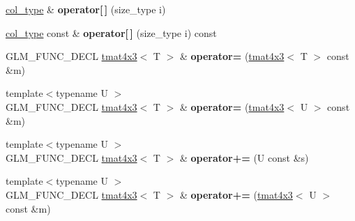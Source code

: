 \begin{DoxyCompactItemize}
\item 
\hypertarget{structglm_1_1detail_1_1tmat4x3_a6c91a6939e72a07834731272a7ee333c}{\hyperlink{structglm_1_1detail_1_1tvec3}{col\-\_\-type} \& {\bfseries operator\mbox{[}$\,$\mbox{]}} (size\-\_\-type i)}\label{structglm_1_1detail_1_1tmat4x3_a6c91a6939e72a07834731272a7ee333c}

\item 
\hypertarget{structglm_1_1detail_1_1tmat4x3_a3c51ea05764cc0449bfd1da1ce552cc0}{\hyperlink{structglm_1_1detail_1_1tvec3}{col\-\_\-type} const \& {\bfseries operator\mbox{[}$\,$\mbox{]}} (size\-\_\-type i) const }\label{structglm_1_1detail_1_1tmat4x3_a3c51ea05764cc0449bfd1da1ce552cc0}

\item 
\hypertarget{structglm_1_1detail_1_1tmat4x3_aa3181a3c75dbb5e906f78d94cd4f8b10}{G\-L\-M\-\_\-\-F\-U\-N\-C\-\_\-\-D\-E\-C\-L \hyperlink{structglm_1_1detail_1_1tmat4x3}{tmat4x3}$<$ T $>$ \& {\bfseries operator=} (\hyperlink{structglm_1_1detail_1_1tmat4x3}{tmat4x3}$<$ T $>$ const \&m)}\label{structglm_1_1detail_1_1tmat4x3_aa3181a3c75dbb5e906f78d94cd4f8b10}

\item 
\hypertarget{structglm_1_1detail_1_1tmat4x3_a4e1d49a1eda2e7f4ce9403c3e96cc447}{{\footnotesize template$<$typename U $>$ }\\G\-L\-M\-\_\-\-F\-U\-N\-C\-\_\-\-D\-E\-C\-L \hyperlink{structglm_1_1detail_1_1tmat4x3}{tmat4x3}$<$ T $>$ \& {\bfseries operator=} (\hyperlink{structglm_1_1detail_1_1tmat4x3}{tmat4x3}$<$ U $>$ const \&m)}\label{structglm_1_1detail_1_1tmat4x3_a4e1d49a1eda2e7f4ce9403c3e96cc447}

\item 
\hypertarget{structglm_1_1detail_1_1tmat4x3_a4b58234c4b05ac0c5702c259efcb0eec}{{\footnotesize template$<$typename U $>$ }\\G\-L\-M\-\_\-\-F\-U\-N\-C\-\_\-\-D\-E\-C\-L \hyperlink{structglm_1_1detail_1_1tmat4x3}{tmat4x3}$<$ T $>$ \& {\bfseries operator+=} (U const \&s)}\label{structglm_1_1detail_1_1tmat4x3_a4b58234c4b05ac0c5702c259efcb0eec}

\item 
\hypertarget{structglm_1_1detail_1_1tmat4x3_af41fbc292245b33e17b1b4b240700628}{{\footnotesize template$<$typename U $>$ }\\G\-L\-M\-\_\-\-F\-U\-N\-C\-\_\-\-D\-E\-C\-L \hyperlink{structglm_1_1detail_1_1tmat4x3}{tmat4x3}$<$ T $>$ \& {\bfseries operator+=} (\hyperlink{structglm_1_1detail_1_1tmat4x3}{tmat4x3}$<$ U $>$ const \&m)}\label{structglm_1_1detail_1_1tmat4x3_af41fbc292245b33e17b1b4b240700628}


\end{DoxyCompactItemize}
